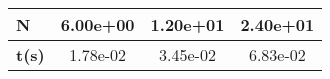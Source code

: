 \begin{tiny}\begin{tabular}{|l|c|c|c|}
\hline
\textbf{N}&6.00e+00&1.20e+01&2.40e+01\\\hline
\textbf{t(s)}&1.78e-02&3.45e-02&6.83e-02\\\hline
\end{tabular}
\end{tiny}